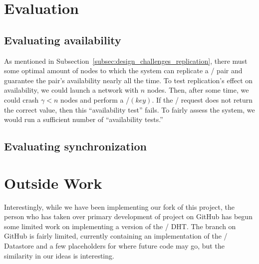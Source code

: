 \documentclass[11pt,twocolumn]{article}
\begin{document}
\section{Evaluation}

\subsection{Evaluating availability}
As mentioned in Subsection~\ref{subsec:design_challenges_replication}, there must some optimal amount of nodes to which the system can replicate a \kv/ pair and guarantee the pair's availability nearly all the time.
To test replication's effect on availability, we could launch a network with $n$ nodes.
Then, after some time, we could crash $\gamma < n$ nodes and perform a \findValue/$(key)$.
If the \findValue/ request does not return the correct value, then this ``availability test'' fails.
To fairly assess the system, we would run a sufficient number of ``availability tests.''

\subsection{Evaluating synchronization}







\section{Outside Work}
Interestingly, while we have been implementing our fork of this project, the person who has taken over primary development of project on GitHub has begun some limited work on implementing a version of the \Kademlia/ DHT.
The branch on GitHub is fairly limited, currently containing an implementation of the \Kademlia/ Datastore and a few placeholders for where future code may go, but the similarity in our ideas is interesting.






\end{document}

